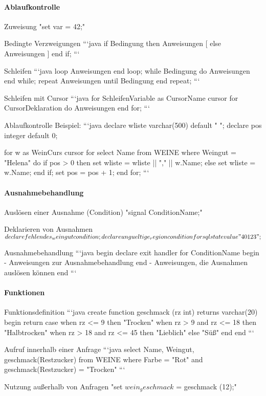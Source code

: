 \documentclass[a4paper]{article}
\begin{document}
\begin{multicols}{3}
\paragraph{Ablaufkontrolle}
\begin{itemize*}
    \item Zuweisung "set var = 42;"
    \item Bedingte Verzweigungen
    ```java
    if Bedingung then Anweisungen
        [ else Anweisungen ] end if;
    ```
    \item Schleifen
    ```java
    loop Anweisungen end loop;
    while Bedingung do
    Anweisungen end while;
    repeat Anweisungen
    until Bedingung end repeat;
    ```
    \item Schleifen mit Cursor
    ```java
    for SchleifenVariable as CursorName cursor for
    CursorDeklaration
    do
    Anweisungen
    end for;
    ```
\end{itemize*}

Ablaufkontrolle Beispiel:
```java
declare wliste varchar(500) default " ";
declare pos integer default 0;

for w as WeinCurs cursor for
select Name from WEINE where Weingut = "Helena"
do
if pos > 0 then
set wliste = wliste || "," || w.Name;
else
set wliste = w.Name;
end if;
set pos = pos + 1;
end for;
```

\paragraph{Ausnahmebehandlung}
\begin{itemize*}
    \item Auslösen einer Ausnahme (Condition) "signal ConditionName;"
    \item Deklarieren von Ausnahmen
    $declare fehlendes_weingut condition;
        declare ungueltige_region
        condition for sqlstate value "40123";$
    \item Ausnahmebehandlung
    ```java
    begin
    declare exit handler for ConditionName
    begin
    - Anweisungen zur Ausnahmebehandlung
    end
    - Anweisungen, die Ausnahmen auslösen können
    end
    ```
\end{itemize*}

\paragraph{Funktionen}
\begin{itemize*}
    \item Funktionsdefinition
    ```java
    create function geschmack (rz int)
    returns varchar(20)
    begin
    return case
    when rz <= 9 then "Trocken"
    when rz > 9 and rz <= 18 then "Halbtrocken"
    when rz > 18 and rz <= 45 then "Lieblich"
    else "Süß"
    end
    end
    ```
    \item Aufruf innerhalb einer Anfrage
    ```java
    select Name, Weingut, geschmack(Restzucker) from WEINE
    where Farbe = "Rot" and geschmack(Restzucker) = "Trocken"
    ```
    \item Nutzung außerhalb von Anfragen "set $wein_geschmack$ = geschmack (12);"
\end{itemize*}


\end{multicols}
\end{document}
